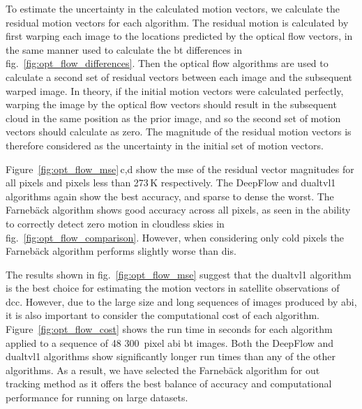 To estimate the uncertainty in the calculated motion vectors, we calculate the residual motion vectors for each algorithm.
The residual motion is calculated by first warping each image to the locations predicted by the optical flow vectors, in the same manner used to calculate the \acrshort{bt} differences in fig.~\ref{fig:opt_flow_differences}.
Then the optical flow algorithms are used to calculate a second set of residual vectors between each image and the subsequent warped image.
In theory, if the initial motion vectors were calculated perfectly, warping the image by the optical flow vectors should result in the subsequent cloud in the same position as the prior image, and so the second set of motion vectors should calculate as zero.
The magnitude of the residual motion vectors is therefore considered as the uncertainty in the initial set of motion vectors.

Figure~\ref{fig:opt_flow_mse}\,c,d show the \acrshort{mse} of the residual vector magnitudes for all pixels and pixels less than 273\,\unit{K} respectively.
The DeepFlow and \acrshort{dualtvl1} algorithms again show the best accuracy, and sparse to dense the worst.
The Farnebäck algorithm shows good accuracy across all pixels, as seen in the ability to correctly detect zero motion in cloudless skies in fig.~\ref{fig:opt_flow_comparison}.
However, when considering only cold pixels the Farnebäck algorithm performs slightly worse than \acrshort{dis}.

The results shown in fig.~\ref{fig:opt_flow_mse} suggest that the \acrshort{dualtvl1} algorithm is the best choice for estimating the motion vectors in satellite observations of \acrshort{dcc}.
However, due to the large size and long sequences of images produced by \acrshort{abi}, it is also important to consider the computational cost of each algorithm.
Figure~\ref{fig:opt_flow_cost} shows the run time in seconds for each algorithm applied to a sequence of 48 300~pixel \acrshort{abi} \acrshort{bt} images.
Both the DeepFlow and \acrshort{dualtvl1} algorithms show significantly longer run times than any of the other algorithms.
As a result, we have selected the Farnebäck algorithm for out tracking method as it offers the best balance of accuracy and computational performance for running on large datasets.


